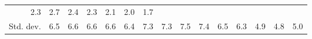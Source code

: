 \begin{tabular}{lllllllllllllll}
  \multicolumn{1}{r}{2.3} &
  \multicolumn{1}{r}{2.7} &
  \multicolumn{1}{r}{2.4} &
  \multicolumn{1}{r}{2.3} &
  \multicolumn{1}{r}{2.1} &
  \multicolumn{1}{r}{2.0} &
  \multicolumn{1}{r}{1.7} \\
\multicolumn{1}{l}{\hspace{2em}Std. dev.} &
  \multicolumn{1}{|r}{6.5} &
  \multicolumn{1}{r}{6.6} &
  \multicolumn{1}{r}{6.6} &
  \multicolumn{1}{r}{6.6} &
  \multicolumn{1}{r}{6.4} &
  \multicolumn{1}{r}{7.3} &
  \multicolumn{1}{r}{7.3} &
  \multicolumn{1}{r}{7.5} &
  \multicolumn{1}{r}{7.4} &
  \multicolumn{1}{r}{6.5} &
  \multicolumn{1}{r}{6.3} &
  \multicolumn{1}{r}{4.9} &
  \multicolumn{1}{r}{4.8} &
  \multicolumn{1}{r}{5.0} \\
\cline{1-15}
\end{tabular}
